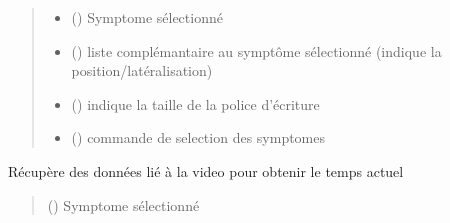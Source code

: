 \documentclass[letterpaper,10pt,english]{sphinxmanual}
\begin{document}
\begin{fulllineitems}
\begin{fulllineitems}
\begin{quote}
\begin{description}
\begin{itemize}
\item {} 
\sphinxAtStartPar
{} () \textendash{} Symptome sélectionné

\item {} 
\sphinxAtStartPar
{} () \textendash{} liste complémantaire au symptôme sélectionné (indique la position/latéralisation)

\item {} 
\sphinxAtStartPar
{} () \textendash{} indique la taille de la police d’écriture

\item {} 
\sphinxAtStartPar
{} () \textendash{} commande de selection des symptomes

\end{itemize}

\end{description}\end{quote}

\end{fulllineitems}


\begin{fulllineitems}
\label{\detokenize{general_interface:general_interface_V9.Menu_symptomes.on_select_obj}}
\pysigstartsignatures
{}
\pysigstopsignatures
\sphinxAtStartPar
Récupère des données lié à la video pour obtenir le temps actuel
\begin{quote}\begin{description}
\sphinxAtStartPar
{} () \textendash{} Symptome sélectionné

\end{description}\end{quote}

\end{fulllineitems}


\end{fulllineitems}
\end{document}
